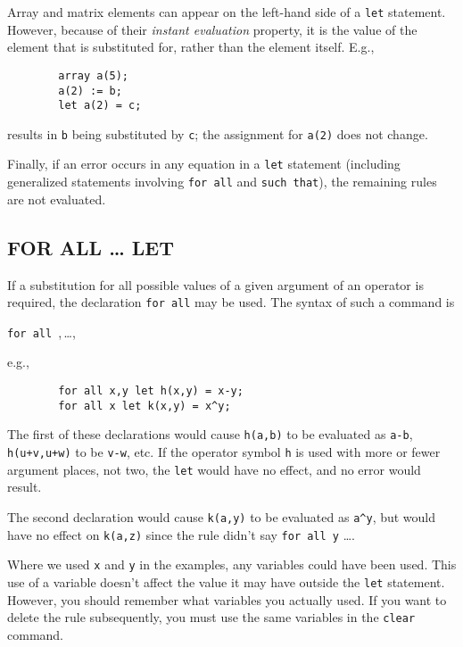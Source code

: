 Array and matrix elements can appear on the left-hand side of a \texttt{let}
statement. However, because of their 
\emph{instant evaluation} property, it is the value of the element that
is substituted for, rather than the element itself.  E.g.,
\begin{verbatim}
        array a(5);
        a(2) := b;
        let a(2) = c;
\end{verbatim}
results in \texttt{b} being substituted by \texttt{c}; the assignment for
\texttt{a(2)} does not change.

Finally, if an error occurs in any equation in a \texttt{let} statement
(including generalized statements involving \texttt{for all} and
\texttt{such that}), the remaining rules are not evaluated.

\subsection{FOR ALL \ldots{} LET}
\hypertarget{command:FORALL}{}
If a substitution for all possible values of a given argument of an
operator is required, the declaration \texttt{for all} may be used. The
syntax of such a command is
\begin{syntax}
  \texttt{for all },\,\dots,\,\
\end{syntax}
e.g.,
\begin{verbatim}
        for all x,y let h(x,y) = x-y;
        for all x let k(x,y) = x^y;
\end{verbatim}
The first of these declarations would cause \texttt{h(a,b)} to be evaluated
as \texttt{a-b}, \texttt{h(u+v,u+w)} to be \texttt{v-w}, etc.  If the operator
symbol \texttt{h} is used with more or fewer argument places, not two, the
\texttt{let} would have no effect, and no error would result.

The second declaration would cause \texttt{k(a,y)} to be evaluated as
\texttt{a\textasciicircum y}, but would have no effect on \texttt{k(a,z)} since the rule
didn't say \texttt{for all y} \ldots .

Where we used \texttt{x} and \texttt{y} in the examples, any variables could
have been used.  This use of a variable doesn't affect the value it may
have outside the \texttt{let} statement.  However, you should remember what
variables you actually used.  If you want to delete the rule subsequently,
you must use the same variables in the \texttt{clear} command.

